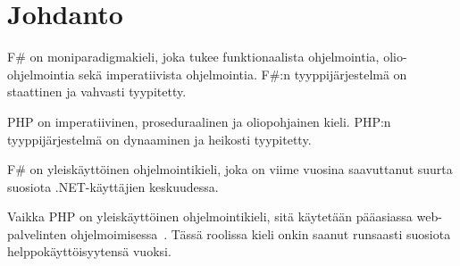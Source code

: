 \section{Johdanto}
F\# on moniparadigmakieli, joka tukee funktionaalista ohjelmointia, olio-ohjelmointia sekä imperatiivista ohjelmointia. F\#:n tyyppijärjestelmä on staattinen ja vahvasti tyypitetty. 
\par
PHP on imperatiivinen, proseduraalinen ja oliopohjainen kieli. PHP:n tyyppijärjestelmä on dynaaminen ja heikosti tyypitetty.
\par
F\# on yleiskäyttöinen ohjelmointikieli, joka on viime vuosina saavuttanut suurta suosiota .NET-käyttäjien keskuudessa.
\par
Vaikka PHP on yleiskäyttöinen ohjelmointikieli, sitä käytetään pääasiassa web-palvelinten ohjelmoimisessa~\cite{WIKIPHP}. Tässä roolissa kieli onkin saanut runsaasti suosiota helppokäyttöisyytensä vuoksi.
